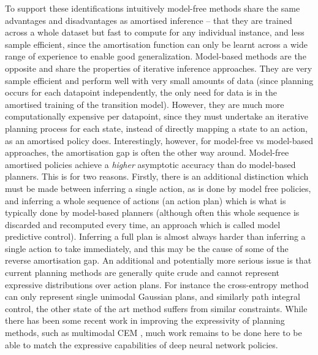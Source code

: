 To support these identifications intuitively model-free methods share the same advantages and disadvantages as amortised inference -- that they are trained across a whole dataset but fast to compute for any individual instance, and less sample efficient, since the amortisation function can only be learnt across a wide range of experience to enable good generalization. Model-based methods are the opposite and share the properties of iterative inference approaches. They are very sample efficient and perform well with very small amounts of data (since planning occurs for each datapoint independently, the only need for data is in the amortised training of the transition model). However, they are much more computationally expensive per datapoint, since they must undertake an iterative planning process for each state, instead of directly mapping a state to an action, as an amortised policy does. Interestingly, however, for model-free vs model-based approaches, the amortisation gap is often the other way around. Model-free amortised policies achieve a \emph{higher} asymptotic accuracy than do model-based planners. This is for two reasons. Firstly, there is an additional distinction which must be made between inferring a single action, as is done by model free policies, and inferring a whole sequence of actions (an action plan) which is what is typically done by model-based planners (although often this whole sequence is discarded and recomputed every time, an approach which is called model predictive control). Inferring a full plan is almost always harder than inferring a single action to take immediately, and this may be the cause of some of the reverse amortisation gap. An additional and potentially more serious issue is that current planning methods are generally quite crude and cannot represent expressive distributions over action plans. For instance the cross-entropy method can only represent single unimodal Gaussian plans, and similarly path integral control, the other state of the art method \citep{williams2017information,williams2017model,williams2018predictive,theodorou2010reinforcement,theodorou2012relative} suffers from similar constraints. While there has been some recent work in improving the expressivity of planning methods, such as multimodal CEM \citep{okada2020planet}, much work remains to be done here to be able to match the expressive capabilities of deep neural network policies.

